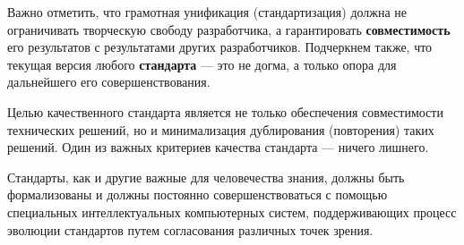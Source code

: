 Важно отметить, что грамотная унификация (стандартизация) должна не ограничивать творческую свободу разработчика, а гарантировать \textbf{совместимость} его результатов с результатами других разработчиков. Подчеркнем также, что текущая версия любого \textbf{стандарта} --- это не догма, а только опора для дальнейшего его совершенствования.

Целью качественного стандарта является не только обеспечения совместимости технических решений, но и минимализация дублирования (повторения) таких решений. Один из важных критериев качества стандарта --- ничего лишнего.

\begin{SCn}
\end{SCn}

Стандарты, как и другие важные для человечества знания, должны быть формализованы и должны постоянно совершенствоваться с помощью специальных интеллектуальных компьютерных систем, поддерживающих процесс эволюции стандартов путем согласования различных точек зрения.

